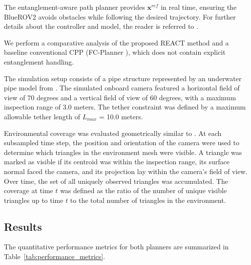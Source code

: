 The entanglement-aware path planner provides $\mathbf{x}^{ref}$ in real time, ensuring the BlueROV2 avoids obstacles while following the desired trajectory. For further details about the controller and model, the reader is referred to \cite{amergp}.

We perform a comparative analysis of the proposed \ac{REACT} method and a baseline conventional \ac{CPP} (FC-Planner \cite{feng2024fc}), which does not contain explicit entanglement handling. 

The simulation setup consists of a pipe structure represented by an underwater pipe model from \cite{feng2024fc}. The simulated onboard camera featured a horizontal field of view of 70 degrees and a vertical field of view of 60 degrees, with a maximum inspection range of 3.0 meters. The tether constraint was defined by a maximum allowable tether length of $L_{max}$ = 10.0 meters.

Environmental coverage was evaluated geometrically similar to \cite{amer2023visual}. At each subsampled time step, the position and orientation of the camera were used to determine which triangles in the environment mesh were visible. A triangle was marked as visible if its centroid was within the inspection range, its surface normal faced the camera, and its projection lay within the camera's field of view. Over time, the set of all uniquely observed triangles was accumulated. The coverage at time $t$ was defined as the ratio of the number of unique visible triangles up to time $t$ to the total number of triangles in the environment.


\subsection{Results}

The quantitative performance metrics for both planners are summarized in Table~\ref{tab:performance_metrics}.

\begin{table}[ht]
    \centering
    \caption{Performance Metrics Comparison}
    \label{tab:performance_metrics}
    \vspace{0.5em}
\end{table}


